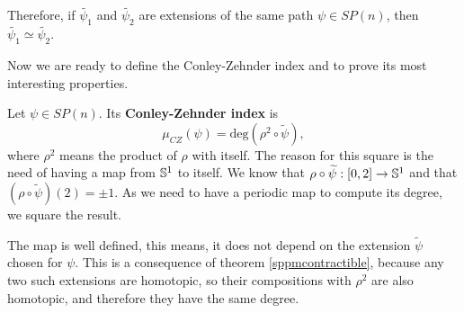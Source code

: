 Therefore, if $\widetilde{\psi_1}$ and $\widetilde{\psi_2}$ are extensions of the same path $\psi \in SP(n)$, then $\widetilde{\psi_1} \simeq \widetilde{\psi_2}$.

Now we are ready to define the Conley-Zehnder index and to prove its most interesting properties.

\begin{deff}
Let $\psi \in SP(n)$. Its {\bf Conley-Zehnder index} is
\[\mu_{CZ}(\psi) = \text{deg}(\rho^2 \circ \widetilde{\psi}) ,\]
where $\rho^2$ means the product of $\rho$ with itself. The reason for this square is the need of having a map from $\mathbb{S}^1$ to itself. We know that $\rho \circ \widetilde{\psi} : [0,2] \rightarrow \mathbb{S}^1$ and that $(\rho \circ \widetilde{\psi})(2) = \pm 1$. As we need to have a periodic map to compute its degree, we square the result.
\end{deff}

\begin{rmrk}
The map is well defined, this means, it does not depend on the extension $\widetilde{\psi}$ chosen for $\psi$. This is a consequence of theorem \ref{sppmcontractible}, because any two such extensions are homotopic, so their compositions with $\rho^2$ are also homotopic, and therefore they have the same degree.
\end{rmrk}

